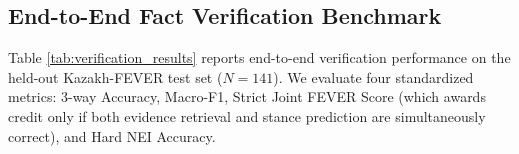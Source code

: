 \subsection{End-to-End Fact Verification Benchmark}
Table \ref{tab:verification_results} reports end-to-end verification performance on the held-out Kazakh-FEVER test set ($N=141$). We evaluate four standardized metrics: 3-way Accuracy, Macro-F1, Strict Joint FEVER Score (which awards credit only if both evidence retrieval and stance prediction are simultaneously correct), and Hard NEI Accuracy.

\begin{table}[htbp]
\centering
\caption{End-to-end fact verification performance on the Kazakh-FEVER 3K held-out test set ($N=141$). Our morphologically-grounded cross-encoder outperforms standard multilingual baselines and zero-shot foundation models.}
\label{tab:verification_results}
\end{table}

